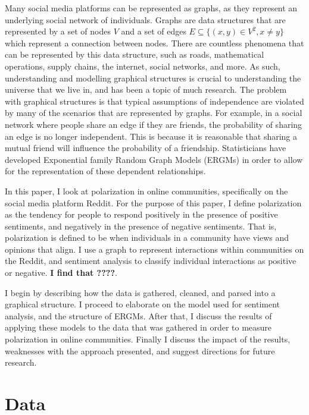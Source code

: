 \documentclass[
]{article}
\begin{document}
Many social media platforms can be represented as graphs, as they represent an underlying social network of individuals. Graphs are data structures that are represented by a set of nodes \(V\) and a set of edges \(E\subseteq\{(x,y)\in V^2,x\not=y\}\) which represent a connection between nodes. There are countless phenomena that can be represented by this data structure, such as roads, mathematical operations, supply chains, the internet, social networks, and more. As such, understanding and modelling graphical structures is crucial to understanding the universe that we live in, and has been a topic of much research. The problem with graphical structures is that typical assumptions of independence are violated by many of the scenarios that are represented by graphs. For example, in a social network where people share an edge if they are friends, the probability of sharing an edge is no longer independent. This is because it is reasonable that sharing a mutual friend will influence the probability of a friendship. Statisticians have developed Exponential family Random Graph Models (ERGMs) in order to allow for the representation of these dependent relationships.

In this paper, I look at polarization in online communities, specifically on the social media platform Reddit. For the purpose of this paper, I define polarization as the tendency for people to respond positively in the presence of positive sentiments, and negatively in the presence of negative sentiments. That is, polarization is defined to be when individuals in a community have views and opinions that align. I use a graph to represent interactions within communities on the Reddit, and sentiment analysis to classify individual interactions as positive or negative. \textbf{I find that ????}.

I begin by describing how the data is gathered, cleaned, and parsed into a graphical structure. I proceed to elaborate on the model used for sentiment analysis, and the structure of ERGMs. After that, I discuss the results of applying these models to the data that was gathered in order to measure polarization in online communities. Finally I discuss the impact of the results, weaknesses with the approach presented, and suggest directions for future research.

\hypertarget{data}{%
\section{Data}\label{data}}
\end{document}
